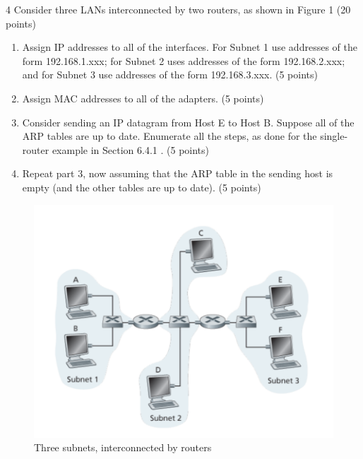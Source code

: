 \begin{exercise}[]{4 Consider three LANs interconnected by two routers, as shown in Figure 1 (20 points)
    \begin{enumerate}
        \item Assign IP addresses to all of the interfaces. For Subnet 1 use addresses of the form
        192.168.1.xxx; for Subnet 2 uses addresses of the form 192.168.2.xxx; and for Subnet
        3 use addresses of the form 192.168.3.xxx. (5 points)
        \item Assign MAC addresses to all of the adapters. (5 points)
        \item Consider sending an IP datagram from Host E to Host B. Suppose all of the ARP
        tables are up to date. Enumerate all the steps, as done for the single-router example
        in Section 6.4.1 . (5 points)
        \item Repeat part 3, now assuming that the ARP table in the sending host is empty (and
        the other tables are up to date). (5 points)
    \end{enumerate}
    \begin{figure}[hb]
      \begin{center}
      \includegraphics[width=12cm]{img/ass5/ex4}
      \caption{Three subnets, interconnected by routers}
      \label{fig:ex4}
      \end{center}
    \end{figure}
    }
  \begin{solution}
  \par{~}
  \end{solution}
  \label{ex4}
\end{exercise}


